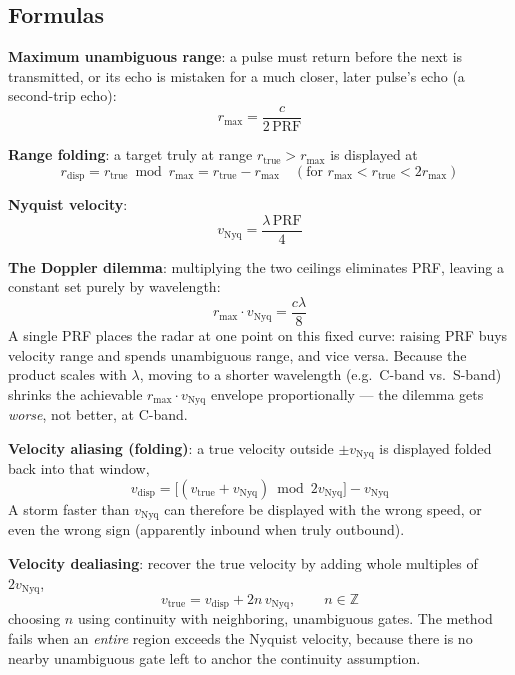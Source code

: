 \documentclass[11pt]{article}
\begin{document}
\subsection{Formulas}

\textbf{Maximum unambiguous range}: a pulse must return before the next is transmitted, or its echo is mistaken for a much closer, later pulse's echo (a second-trip echo):
\begin{equation}
r_{\max} = \frac{c}{2\,\mathrm{PRF}}
\end{equation}

\textbf{Range folding}: a target truly at range $r_{\mathrm{true}} > r_{\max}$ is displayed at
\begin{equation}
r_{\mathrm{disp}} = r_{\mathrm{true}} \bmod r_{\max} = r_{\mathrm{true}} - r_{\max}\quad(\text{for } r_{\max} < r_{\mathrm{true}} < 2r_{\max})
\end{equation}

\textbf{Nyquist velocity}:
\begin{equation}
v_{\mathrm{Nyq}} = \frac{\lambda\,\mathrm{PRF}}{4}
\end{equation}

\textbf{The Doppler dilemma}: multiplying the two ceilings eliminates PRF, leaving a constant set purely by wavelength:
\begin{equation}
r_{\max}\cdot v_{\mathrm{Nyq}} = \frac{c\lambda}{8}
\end{equation}
A single PRF places the radar at one point on this fixed curve: raising PRF buys velocity range and spends unambiguous range, and vice versa. Because the product scales with $\lambda$, moving to a shorter wavelength (e.g.\ C-band vs.\ S-band) shrinks the achievable $r_{\max}\cdot v_{\mathrm{Nyq}}$ envelope proportionally --- the dilemma gets \emph{worse}, not better, at C-band.

\textbf{Velocity aliasing (folding)}: a true velocity outside $\pm v_{\mathrm{Nyq}}$ is displayed folded back into that window,
\begin{equation}
v_{\mathrm{disp}} = \big[(v_{\mathrm{true}} + v_{\mathrm{Nyq}})\bmod 2v_{\mathrm{Nyq}}\big] - v_{\mathrm{Nyq}}
\end{equation}
A storm faster than $v_{\mathrm{Nyq}}$ can therefore be displayed with the wrong speed, or even the wrong sign (apparently inbound when truly outbound).

\textbf{Velocity dealiasing}: recover the true velocity by adding whole multiples of $2v_{\mathrm{Nyq}}$,
\begin{equation}
v_{\mathrm{true}} = v_{\mathrm{disp}} + 2n\,v_{\mathrm{Nyq}}, \qquad n\in\mathbb{Z}
\end{equation}
choosing $n$ using continuity with neighboring, unambiguous gates. The method fails when an \emph{entire} region exceeds the Nyquist velocity, because there is no nearby unambiguous gate left to anchor the continuity assumption.
\end{document}
